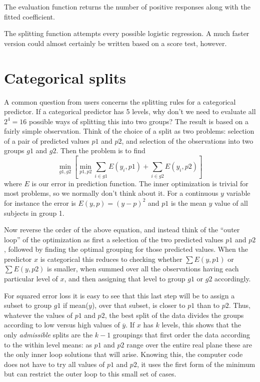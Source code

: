 \Rcodeplaceholder{}

The evaluation function returns the number of positive responses
along with the fitted coefficient.

The splitting function attempts every possible logistic regression.
A much faster version could almost certainly be written based on
a score test, however.

\Rcodeplaceholder{}

\section{Categorical splits}
A common question from users concerns the splitting rules for a categorical
predictor.
If a categorical predictor has 5 levels, why don't we need to evaluate all
$2^4 = 16$ possible ways of splitting this into two groups?
The result is based on a fairly simple observation.
Think of the choice of a split as two problems: selection of a pair of
predicted values $p1$ and $p2$, and selection of the observations into
two groups $g1$ and $g2$.
Then the problem is to find
\begin{equation*}
  \min_{g1, g2} \left[\min_{p1, p2} \sum_{i \in g1} E(y_i, p1) +  
    \sum_{i \in g2} E(y_i, p2)  \right]
\end{equation*}
where $E$ is our error in prediction function.
The inner optimization is trivial for most problems, so we normally
don't think about it.
For a continuous $y$ variable for instance the error is
$E(y,p) = (y-p)^2$ and $p1$ is the mean $y$ value of all subjects in
group 1.

Now reverse the order of the above equation, and instead think of the
``outer loop'' of the optimization as first a selection of the two predicted
values $p1$ and $p2$, followed by finding the optimal grouping for those
predicted values.  
When the predictor $x$ is categorical this reduces to checking
whether $\sum E(y, p1)$ or $\sum E(y, p2)$ is smaller, 
when summed over all the observations having each particular level of $x$,
and then assigning that level to group $g1$ or $g2$ accordingly.

For squared error loss it is easy to see that this last step will be to
assign a subset to group $g1$ if mean($y$), over that subset, is closer to
$p1$ than to $p2$.  
Thus, whatever the values of $p1$ and $p2$, the best split of the data
divides the groups according to low versus high values of $\overline y$.
If $x$ has $k$ levels, this shows that the only \emph{admissible} splits
are the $k-1$ groupings that first order the data according to the 
within level means: as $p1$ and $p2$ range over the entire real plane these
are the only inner loop solutions that will arise.  
Knowing this, the computer code does not have to try all values of 
$p1$ and $p2$, it uses the first form of the minimum but can restrict the
outer loop to this small set of cases.

